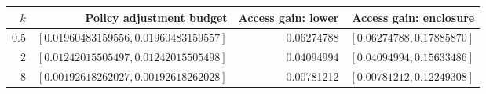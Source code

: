 \begin{tabular}{r r r r}
\toprule
$k$ & Policy adjustment budget & Access gain: lower & Access gain: enclosure \\
\midrule
0.5 & $[0.01960483159556,0.01960483159557]$ & 0.06274788 & $[0.06274788,0.17885870]$ \\
2 & $[0.01242015505497,0.01242015505498]$ & 0.04094994 & $[0.04094994,0.15633486]$ \\
8 & $[0.00192618262027,0.00192618262028]$ & 0.00781212 & $[0.00781212,0.12249308]$ \\
\bottomrule
\end{tabular}

